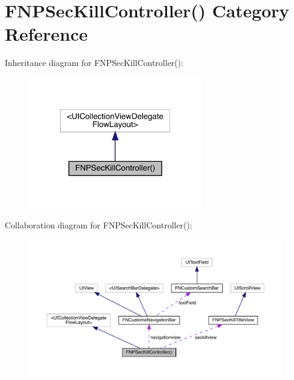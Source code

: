 \hypertarget{category_f_n_p_sec_kill_controller_07_08}{}\section{F\+N\+P\+Sec\+Kill\+Controller() Category Reference}
\label{category_f_n_p_sec_kill_controller_07_08}


Inheritance diagram for F\+N\+P\+Sec\+Kill\+Controller()\+:\nopagebreak
\begin{figure}[H]
\begin{center}
\leavevmode
\includegraphics[width=217pt]{category_f_n_p_sec_kill_controller_07_08__inherit__graph}
\end{center}
\end{figure}


Collaboration diagram for F\+N\+P\+Sec\+Kill\+Controller()\+:\nopagebreak
\begin{figure}[H]
\begin{center}
\leavevmode
\includegraphics[width=350pt]{category_f_n_p_sec_kill_controller_07_08__coll__graph}
\end{center}
\end{figure}
